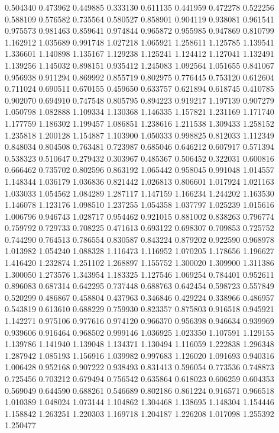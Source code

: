 0.504340
0.473962
0.449885
0.333130
0.611135
0.441959
0.472278
0.522256
0.588109
0.576582
0.735564
0.580527
0.858901
0.904119
0.938081
0.961541
0.975573
0.981463
0.859641
0.974844
0.965872
0.955985
0.947869
0.810799
1.162912
1.035689
0.991748
1.027218
1.065921
1.258611
1.125785
1.139541
1.336601
1.140898
1.135167
1.129238
1.125241
1.124412
1.127041
1.132491
1.139256
1.145032
0.898151
0.935412
1.245083
1.092564
1.051655
0.841067
0.956938
0.911294
0.869992
0.855719
0.802975
0.776445
0.753120
0.612604
0.711024
0.690511
0.670155
0.459650
0.633757
0.621894
0.618745
0.410785
0.902070
0.694910
0.747548
0.805795
0.894223
0.919217
1.197139
0.907279
1.050798
1.082888
1.109334
1.130368
1.146335
1.157821
1.231169
1.171740
1.177759
1.186302
1.199457
1.086851
1.238616
1.211538
1.309433
1.258152
1.235818
1.200128
1.154887
1.103900
1.050333
0.998825
0.812033
1.112349
0.848034
0.804508
0.763481
0.723987
0.685046
0.646212
0.607917
0.571394
0.538323
0.510647
0.279432
0.303967
0.485367
0.506452
0.322031
0.600816
0.666462
0.735702
0.802596
0.863192
1.065442
0.958045
0.991048
1.014557
1.148344
1.036179
1.036836
0.821442
1.026813
0.806601
1.017924
1.021163
1.033033
1.054562
1.084289
1.287117
1.147159
1.166234
1.244202
1.163530
1.146078
1.123176
1.098510
1.237255
1.054358
1.037797
1.025239
1.015616
1.006796
0.946743
1.028717
0.954462
0.921015
0.881002
0.838263
0.796774
0.759792
0.729733
0.708225
0.471613
0.693122
0.698307
0.709853
0.725752
0.744290
0.764513
0.786554
0.830587
0.843224
0.879202
0.922590
0.968978
1.013982
1.054240
1.088328
1.116473
1.116952
1.070205
1.178656
1.196627
1.416420
1.232874
1.251102
1.268897
1.155752
1.300020
1.309900
1.311386
1.300050
1.273576
1.343954
1.183325
1.127546
1.069254
0.784401
0.952611
0.896083
0.687314
0.642295
0.737448
0.688763
0.642454
0.598723
0.557849
0.520299
0.486867
0.458804
0.437963
0.346846
0.429224
0.338966
0.486957
0.543819
0.613610
0.688229
0.759930
0.823357
0.875803
0.916518
0.945921
1.142271
0.975106
0.977616
0.974120
0.966370
0.956398
0.946634
0.939969
0.939606
0.916464
0.968502
0.999146
1.036925
1.023350
1.107591
1.129155
1.139786
1.141940
1.139048
1.134371
1.130494
1.116059
1.222838
1.296348
1.287942
1.085193
1.156916
1.039982
0.997683
1.126020
1.091693
0.940316
1.006428
0.952168
0.907222
0.938493
0.831413
0.596054
0.773536
0.748873
0.725456
0.703212
0.679494
0.756542
0.635864
0.618023
0.606259
0.604353
0.569049
0.644590
0.688261
0.546689
0.802186
0.861224
0.916571
0.966518
1.010389
1.048024
1.073144
1.104862
1.304468
1.138695
1.148304
1.154446
1.158842
1.263251
1.220303
1.169718
1.204187
1.226208
1.017098
1.255392
1.250477
